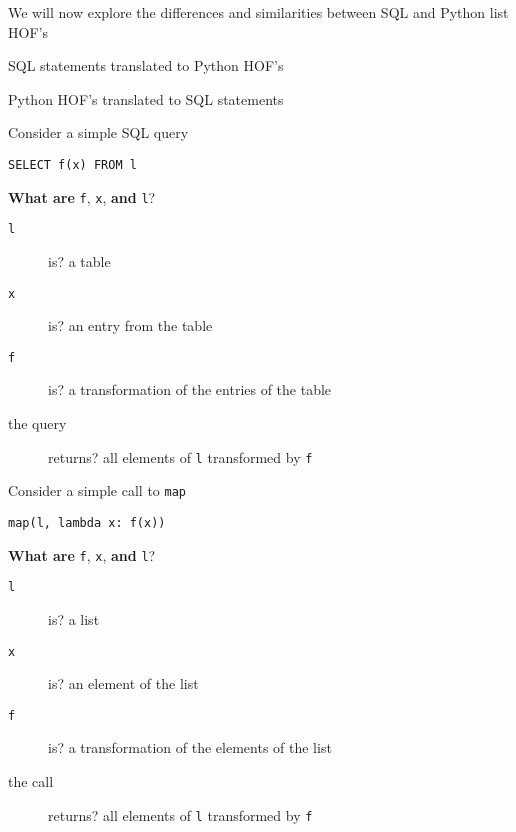 \documentclass{beamer}
\begin{document}
\begin{slide}{
\item We will now explore the differences and similarities between SQL and Python list HOF's
\item SQL statements translated to Python HOF's
\item Python HOF's translated to SQL statements 
}\end{slide}

\begin{slide}{
\item Consider a simple SQL query
\item \texttt{SELECT f(x) FROM l}
\item \textbf{What are} \texttt{f}, \texttt{x}, \textbf{and} \texttt{l}?
\begin{description}
\item[\texttt{l}] is? \pause a table
\item[\texttt{x}] is? \pause an entry from the table
\item[\texttt{f}] is? \pause a transformation of the entries of the table
\item[the query] returns? all elements of \texttt{l} transformed by \texttt{f}
\end{description}
}\end{slide}

\begin{slide}{
\item Consider a simple call to \texttt{map}
\item \texttt{map(l, lambda x: f(x))}
\item \textbf{What are} \texttt{f}, \texttt{x}, \textbf{and} \texttt{l}?
\begin{description}
\item[\texttt{l}] is? \pause a list
\item[\texttt{x}] is? \pause an element of the list
\item[\texttt{f}] is? \pause a transformation of the elements of the list
\item[the call] returns? all elements of \texttt{l} transformed by \texttt{f}
\end{description}
}\end{slide}
\end{document}
